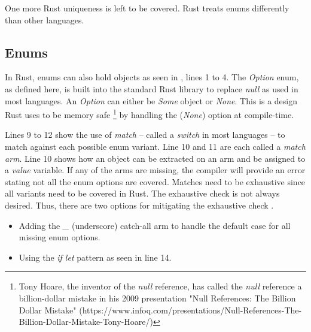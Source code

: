 
One more Rust uniqueness is left to be covered. Rust treats enums differently than other languages.

\subsection{Enums}
In Rust, enums can also hold objects \cite{klabnik_2019_01} as seen in , lines 1 to 4.
The \textit{Option} enum, as defined here, is built into the standard Rust library \cite{klabnik_2019_01} to replace \textit{null} as used in most languages.
An \textit{Option} can either be \textit{Some} object or \textit{None}.
This is a design Rust uses to be memory safe \footnote{Tony Hoare, the inventor of the \textit{null} reference, has called the \textit{null} reference a billion-dollar mistake in his 2009 presentation "Null References: The Billion Dollar Mistake" (https://www.infoq.com/presentations/Null-References-The-Billion-Dollar-Mistake-Tony-Hoare/)} by handling the (\textit{None}) option at compile-time.


Lines 9 to 12 show the use of \textit{match} -- called a \textit{switch} in most languages -- to match against each possible enum variant.
Line 10 and 11 are each called a \textit{match arm}.
Line 10 shows how an object can be extracted on an arm and be assigned to a \textit{value} variable.
If any of the arms are missing, the compiler will provide an error stating not all the enum options are covered.
Matches need to be exhaustive since all variants need to be covered in Rust.
The exhaustive check is not always desired.
Thus, there are two options for mitigating the exhaustive check \cite{klabnik_2019_01}.

\begin{itemize}
	\item Adding the \textit{\_} (underscore) catch-all arm to handle the default case for all missing enum options.
	\item Using the \textit{if let} pattern as seen in line 14.
\end{itemize}

